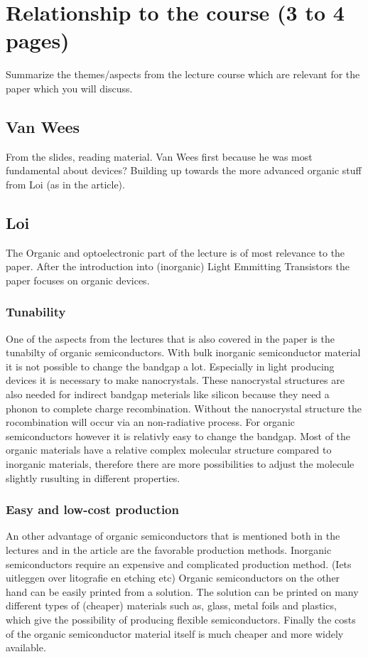 \section{Relationship to the course (3 to 4 pages)}
Summarize the themes/aspects from the lecture course which are relevant for the paper which you will discuss. 



\subsection{Van Wees}
From the slides, reading material. Van Wees first because he was most fundamental about devices? Building up towards the more advanced organic stuff from Loi (as in the article).



\subsection{Loi}
The Organic and optoelectronic part of the lecture is of most relevance to the paper. After the introduction into (inorganic) Light Emmitting Transistors the paper focuses on organic devices. 

\subsubsection{Tunability}
One of the aspects from the lectures that is also covered in the paper is the tunabilty of organic semiconductors. With bulk inorganic semiconductor material it is not possible to change the bandgap a lot. Especially in light producing devices it is necessary to make nanocrystals. These nanocrystal structures are also needed for indirect bandgap meterials like silicon because they need a phonon to complete charge recombination. Without the nanocrystal structure the rocombination will occur via an non-radiative process. For organic semiconductors however it is relativly easy to change the bandgap. Most of the organic materials have a relative complex molecular structure compared to inorganic materials, therefore there are more possibilities to adjust the molecule slightly rusulting in different properties. 
\subsubsection{Easy and low-cost production}
An other advantage of organic semiconductors that is mentioned both in the lectures and in the article are the favorable production methods. Inorganic semiconductors require an expensive and complicated production method. (Iets uitleggen over litografie en etching etc) Organic semiconductors on the other hand can be easily printed from a solution. The solution can be printed on many different types of (cheaper) materials such as, glass, metal foils and plastics, which give the possibility of producing flexible semiconductors. Finally the costs of the organic semiconductor material itself is much cheaper and more widely available.
